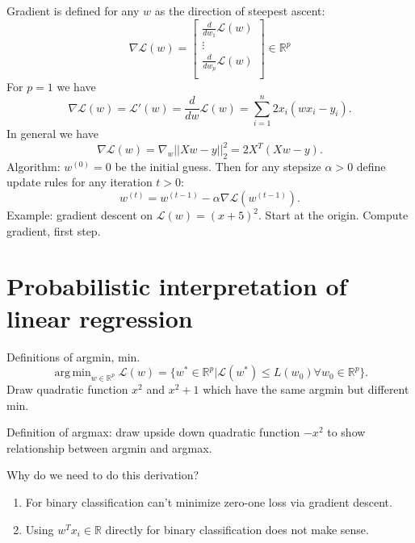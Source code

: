 \documentclass{article}
\DeclareMathOperator*{\argmin}{arg\,min}
\begin{document}
Gradient is defined for any $w$ as the direction of steepest ascent:
\begin{equation}
  \nabla \mathcal L(w) = \left[\begin{array}{c}
              \frac{d}{dw_1} \mathcal L(w)\\
              \vdots \\
              \frac{d}{dw_p} \mathcal L(w)\\
\end{array}\right]\in\mathbb R^{p}
\end{equation}
For $p=1$ we have 
\begin{equation}
  \nabla \mathcal L(w) = \mathcal L'(w) = \frac{d}{dw}\mathcal L(w) = 
  \sum_{i=1}^n 2x_i(w x_i - y_i).
\end{equation}
In general we have
\begin{equation}
  \nabla \mathcal L(w) = 
  \nabla_w ||Xw - y||_2^2 = 
  2X^T(Xw-y).
\end{equation}
Algorithm: $w^{(0)}=0$ be the initial guess.
Then for any stepsize $\alpha>0$ define update rules for any iteration $t>0$:
\begin{equation}
  w^{(t)} = w^{(t-1)} - \alpha \nabla \mathcal L(w^{(t-1)}).
\end{equation}
Example: gradient descent on $\mathcal L(w)=(x+5)^2$. Start at the
origin. Compute gradient, first step.

\section{Probabilistic interpretation of linear regression}

Definitions of argmin, min.
\begin{equation*}
  \argmin_{w\in\mathbb R^p}\mathcal L(w) = \{w^*\in\mathbb R^p|\mathcal L(w^*)\leq L(w_0) \forall w_0\in\mathbb R^p\}.
\end{equation*}
Draw quadratic function $x^2$ and $x^2+1$ which have the same argmin
but different min.

Definition of argmax: draw upside down quadratic function $-x^2$ to
show relationship between argmin and argmax.

Why do we need to do this derivation? 
\begin{enumerate}
\item For binary classification can't minimize zero-one loss via gradient
descent.
\item Using $w^T x_i\in\mathbb R$ directly for binary classification
  does not make sense.
\end{enumerate}
\end{document}
